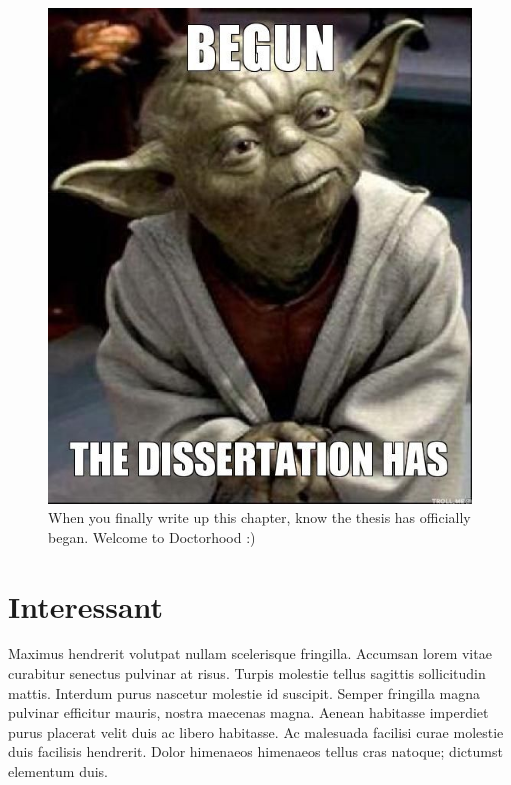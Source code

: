 \begin{figure}[!hbt]
    \centering
    \includegraphics[width=1\linewidth]{figures/chapter_1/start.jpg}
    \caption[When you finally write up this chapter seriously, know the thesis has officially began.]{When you finally write up this chapter, know the thesis has officially began. Welcome to Doctorhood :)}
    \label{fig:scientists-start}
\end{figure}

\section{Interessant}
Maximus hendrerit volutpat nullam scelerisque fringilla. Accumsan lorem vitae curabitur senectus pulvinar at risus. Turpis molestie tellus sagittis sollicitudin mattis. Interdum purus nascetur molestie id suscipit. Semper fringilla magna pulvinar efficitur mauris, nostra maecenas magna. Aenean habitasse imperdiet purus placerat velit duis ac libero habitasse. Ac malesuada facilisi curae molestie duis facilisis hendrerit. Dolor himenaeos himenaeos tellus cras natoque; dictumst elementum duis.

